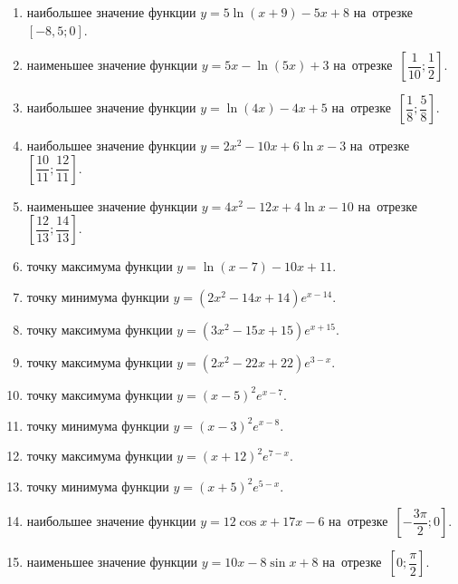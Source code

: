 \documentclass[a4paper,10pt]{article}
\begin{document}
\begin{enumerate}
\item {} наибольшее значение функции $y=5\ln \left(x+9\right)-5x+8$ на~отрезке~$\left[-8,5;0\right]$.

\item {} наименьшее значение функции $y=5x-\ln \left(5x\right)+3$ на~отрезке~$\left[\dfrac{1}{10};\dfrac{1}{2}\right]$.

\item {} наибольшее значение функции $y=\ln \left(4x\right)-4x+5$ на~отрезке~$\left[\dfrac{1}{8};\dfrac{5}{8}\right]$.

\item {} наибольшее значение функции $y=2x^2-10x+6\ln x-3$ на~отрезке~$\left[\dfrac{10}{11};\dfrac{12}{11}\right]$.

\item {} наименьшее значение функции $y=4x^2-12x+4\ln x-10$ на~отрезке~$\left[\dfrac{12}{13};\dfrac{14}{13}\right]$.

\item {} точку максимума функции $y=\ln \left(x-7\right)-10x+11$.

\item {} точку минимума функции $y=\left(2x^2-14x+14\right)e^{x-14}$.

\item {} точку максимума функции $y=\left(3x^2-15x+15\right)e^{x+15}$.

\item {} точку максимума функции $y=\left(2x^2-22x+22\right)e^{3-x}$.

\item {} точку максимума функции $y=\left(x-5\right)^2e^{x-7}$.

\item {} точку минимума функции $y=\left(x-3\right)^2e^{x-8}$.

\item {} точку максимума функции $y=\left(x+12\right)^2e^{7-x}$.

\item {} точку минимума функции $y=\left(x+5\right)^2e^{5-x}$.

\item {} наибольшее значение функции $y=12\cos x+17x-6$ на~отрезке~$\left[-\dfrac{3\pi }{2};0\right]$.

\item {} наименьшее значение функции $y=10x-8\sin x+8$ на~отрезке~$\left[0;\dfrac{\pi }{2}\right]$.


\end{enumerate}
\end{document}
